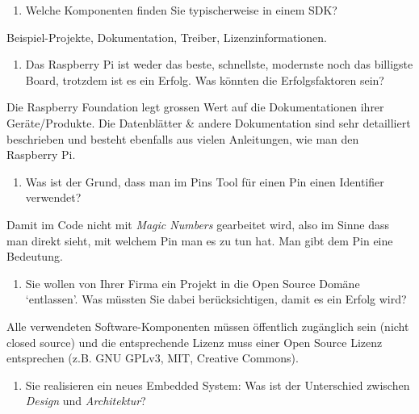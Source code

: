 \documentclass[
  10pt,
  a4paper,
]{article}
\providecommand{\tightlist}{%
  \setlength{\itemsep}{0pt}\setlength{\parskip}{0pt}}\usepackage{longtable,booktabs,array}
\numberwithin{equation}{section}
\begin{document}
\begin{enumerate}
\def\labelenumi{\arabic{enumi}.}
\setcounter{enumi}{4}
\tightlist
\item
  Welche Komponenten finden Sie typischerweise in einem SDK?
\end{enumerate}

Beispiel-Projekte, Dokumentation, Treiber, Lizenzinformationen.

\begin{enumerate}
\def\labelenumi{\arabic{enumi}.}
\setcounter{enumi}{5}
\tightlist
\item
  Das Raspberry Pi ist weder das beste, schnellste, modernste noch das
  billigste Board, trotzdem ist es ein Erfolg. Was könnten die
  Erfolgsfaktoren sein?
\end{enumerate}

Die Raspberry Foundation legt grossen Wert auf die Dokumentationen ihrer
Geräte/Produkte. Die Datenblätter \& andere Dokumentation sind sehr
detailliert beschrieben und besteht ebenfalls aus vielen Anleitungen,
wie man den Raspberry Pi.

\begin{enumerate}
\def\labelenumi{\arabic{enumi}.}
\setcounter{enumi}{6}
\tightlist
\item
  Was ist der Grund, dass man im Pins Tool für einen Pin einen
  Identifier verwendet?
\end{enumerate}

Damit im Code nicht mit \emph{Magic Numbers} gearbeitet wird, also im
Sinne dass man direkt sieht, mit welchem Pin man es zu tun hat. Man gibt
dem Pin eine Bedeutung.

\begin{enumerate}
\def\labelenumi{\arabic{enumi}.}
\setcounter{enumi}{7}
\tightlist
\item
  Sie wollen von Ihrer Firma ein Projekt in die Open Source Domäne
  `entlassen'. Was müssten Sie dabei berücksichtigen, damit es ein
  Erfolg wird?
\end{enumerate}

Alle verwendeten Software-Komponenten müssen öffentlich zugänglich sein
(nicht closed source) und die entsprechende Lizenz muss einer Open
Source Lizenz entsprechen (z.B. GNU GPLv3, MIT, Creative Commons).

\begin{enumerate}
\def\labelenumi{\arabic{enumi}.}
\setcounter{enumi}{8}
\tightlist
\item
  Sie realisieren ein neues Embedded System: Was ist der Unterschied
  zwischen \emph{Design} und \emph{Architektur}?
\end{enumerate}
\end{document}
